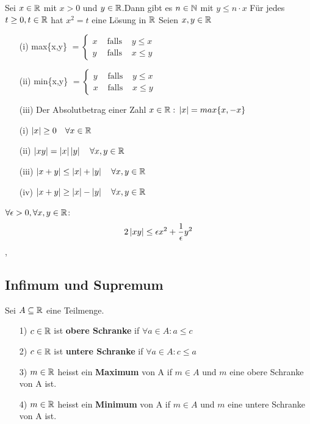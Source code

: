  \newline
Sei \(x \in \mathbb{R}\) mit \(x > 0\) und \(y \in \mathbb{R}\).Dann gibt es \(n \in \mathbb{N}\) mit \(y \leq n \cdot x\) \newline \newline \newline
\Satz[1.8] \newline
Für jedes \(t \geq 0, t \in \mathbb{R}\) hat \(x^2 = t\) eine Lösung in \(\mathbb{R}\) \newline
\Def[1.9] Seien \(x,y \in \mathbb{R} \) \newline
\begin{enumerate}
    \item [(i)] max\{x,y\} \(= \left\{\begin{array}{lll}
        x & \text { falls } & y \leq x \\
        y & \text { falls } & x \leq y
        \end{array}\right.\)
    \item[(ii)] min\{x,y\}  \(= \left\{\begin{array}{lll}
        y & \text { falls } & y \leq x \\
        x & \text { falls } & x \leq y
        \end{array}\right.\)
    \item[(iii)]  Der Absolutbetrag einer Zahl \(x \in \R: \newline \abs{x} = max\{x, -x\}\)
\end{enumerate}
\Satz[1.10]
\begin{enumerate}
    \item [(i)] \( \left\lvert x \right\rvert \geq 0 \quad \forall x \in \mathbb{R} \)
    \item [(ii)] \(\left\lvert xy \right\rvert = \left\lvert x \right\rvert\left\lvert y \right\rvert \quad \forall x,y \in \mathbb{R} \)
    \item [(iii)] \(\left\lvert x+ y \right\rvert \leq \left\lvert x \right\rvert + \left\lvert y \right\rvert \quad \forall x,y \in \mathbb{R}\)
    \item [(iv)] \( \left\lvert x + y \right\rvert \geq \left\lvert x \right\rvert - \left\lvert y \right\rvert \quad \forall x,y \in \mathbb{R}\)
\end{enumerate}
 \newline
\(\forall \epsilon > 0, \forall x,y \in \mathbb{R} \):
\[2 \left\lvert xy \right\rvert \leq \epsilon x^2 + \frac{1}{\epsilon}y^2\]
\sep
\subsection{Infimum und Supremum}
\Def[1.12]  Sei \(A \subseteq \mathbb{R}\) eine Teilmenge.
\begin{enumerate}
\item[1)]  \(c \in \mathbb{R}\) ist \textbf{obere Schranke} if  \(\forall a \in A: a \leq c\)
\item[2)]  \(c \in \mathbb{R}\) ist \textbf{untere Schranke} if \(\forall a \in A: c \leq a\)
\item[3)] \(m \in \mathbb{R}\) heisst ein \textbf{Maximum} von A if \(m \in A\) und \(m\) eine obere Schranke von A ist.
\item[4)] \(m \in \mathbb{R}\) heisst ein \textbf{Minimum} von A if \(m \in A\) und \(m\) eine untere Schranke von A ist.
\end{enumerate}

